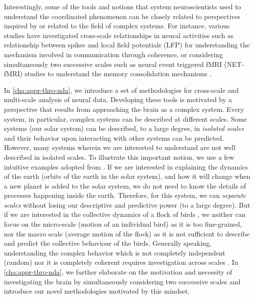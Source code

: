 Interestingly, some of the tools and notions that system neuroscientists used to understand the coordinated phenomenon can be closely related to perspectives inspired by 
or related to the field of complex systems.
For instance, various studies have investigated cross-scale relationships in neural activities such as
relationship between spikes and local field potentials (LFP) 
\cite{mitraObservedBrainDynamics2007} for understanding the mechanism involved in communication through coherence,
or considering simultaneously two successive scales such as neural event triggered fMRI (NET-fMRI)
studies to understand the memory consolidation mechanisms
\cite{logothetisIntracorticalRecordingsFMRI2012,logothetisHippocampalCorticalInteraction2012,ramirez-villegasDiversitySharpwaverippleLFP2015}.

In \autoref{cha:appr-thro-nda},
we introduce a set of methodologies for cross-scale and multi-scale analysis of neural data.
Developing these tools is motivated by a perspective that results from approaching the brain as a complex system. %
Every system, in particular, complex systems can be described at different scales.
% 
Some systems (\eg our solar system) can be described, to a large degree, in \emph{isolated scales} and their behavior upon interacting with other systems can be predicted.
However, many systems wherein we are interested to understand are not well described in isolated scales.
To illustrate this important notion, we use a few intuitive examples adopted from
.
If we are interested in explaining the dynamics of the earth 
(orbits of the earth in the solar system),
and how it will change when a new planet is added to the solar system,
we do not need to know the details of processes happening inside the earth.
Therefore, for this system, we can \emph{separate scales} without losing our descriptive and predictive power (to a large degree).
But if we are interested in the collective dynamics of a flock of birds \cite{bialekStatisticalMechanicsNatural2012},
we neither can focus on the micro-scale (motion of an individual bird) as it is too fine-grained,
nor the macro scale (average motion of the flock) as it is not sufficient to describe and predict the collective behaviour of the birds.
Generally speaking, understanding the complex behavior which is not completely independent (random) nor it is completely coherent requires investigation across scales \cite{bar-yamWhyComplexityDifferent2017}.
In \autoref{cha:appr-thro-nda}, we further elaborate on the motivation and necessity of investigating the brain by simultaneously considering  two successive scales and introduce our novel methodologies motivated by this mindset.

